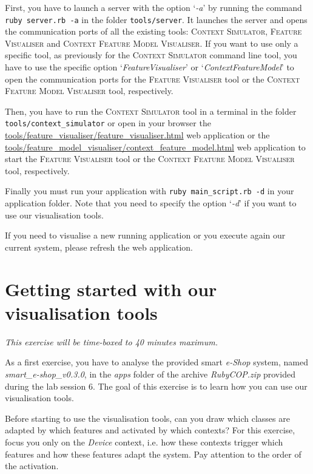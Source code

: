 \documentclass{article}
\begin{document}
First, you have to launch a server with the option `\emph{-a}' by running the command \texttt{ruby server.rb -a} in the folder \texttt{tools/server}. It launches the server and opens the communication ports of all the existing tools: \textsc{Context Simulator}, \textsc{Feature Visualiser} and  \textsc{Context Feature Model Visualiser}. If you want to use only a specific tool, as previously for the \textsc{Context Simulator} command line tool, you have to use the specific option `\emph{FeatureVisualiser}' or `\emph{ContextFeatureModel}' to open the communication ports for the \textsc{Feature Visualiser} tool or the \textsc{Context Feature Model Visualiser} tool, respectively.

Then, you have to run the \textsc{Context Simulator} tool in a terminal in the folder \texttt{tools/context\_simulator} or open in your browser the \url{tools/feature_visualiser/feature_visualiser.html} web application or the \url{tools/feature_model_visualiser/context_feature_model.html} web application to start the \textsc{Feature Visualiser} tool or the \textsc{Context Feature Model Visualiser} tool, respectively. 

Finally you must run your application with \texttt{ruby main\_script.rb -d} in your application folder. Note that you need to specify the option `\emph{-d}' if you want to use our visualisation tools.

If you need to visualise a new running application or you execute again our current system, please refresh the web application.

\section{Getting started with our visualisation tools}

\begin{flushright}
\emph{This exercise will be time-boxed to 40 minutes maximum.}
\end{flushright}

As a first exercise, you have to analyse the provided smart \emph{e-Shop} system, named \emph{smart\_e-shop\_v0.3.0}, in the \emph{apps} folder of the archive \emph{RubyCOP.zip} provided during the lab session 6. The goal of this exercise is to learn how you can use our visualisation tools.

Before starting to use the visualisation tools, can you draw which classes are adapted by which features and activated by which contexts? For this exercise, focus you only on the \emph{Device} context, i.e. how these contexts trigger which features and how these features adapt the system. Pay attention to the order of the activation.
\end{document}
